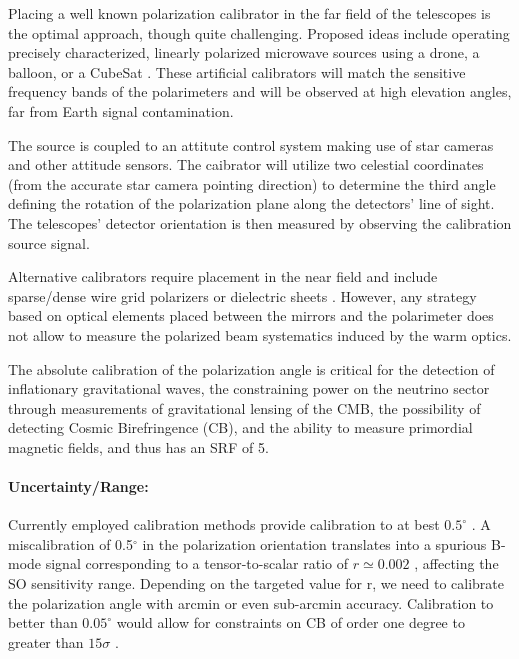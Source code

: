 Placing a well known polarization calibrator in the far field of the telescopes
is the optimal approach, though quite challenging. Proposed ideas include
operating precisely characterized, linearly polarized microwave sources using a
drone, a balloon, or a CubeSat \cite{nati_2017, Johnson2015}. These artificial
calibrators will match the sensitive frequency bands of the polarimeters and
will be observed at high elevation angles, far from Earth signal contamination.

The source is coupled to an attitute control system making use of star cameras
and other attitude sensors. The caibrator will utilize two celestial
coordinates (from the accurate star camera pointing direction) to determine the
third angle defining the rotation of the polarization plane along the
detectors' line of sight. The telescopes' detector orientation is then measured
by observing the calibration source signal. 


Alternative calibrators require placement in the near field and include
sparse/dense wire grid polarizers or dielectric sheets \cite{Takahashi2010,
2016arXiv160701825K}.  However, any strategy based on optical elements placed
between the mirrors and the polarimeter does not allow to measure the polarized
beam systematics induced by the warm optics. 


The absolute calibration of the polarization angle is critical for the
detection of inflationary gravitational waves, the constraining power on the
neutrino sector through measurements of gravitational lensing of the CMB, the
possibility of detecting Cosmic Birefringence (CB), and the ability to measure
primordial magnetic fields, and thus has an SRF of 5.

\paragraph{Uncertainty/Range:}

Currently employed calibration methods provide calibration to at
best $0.5^{\circ}$ \cite{2016MNRAS.455.1981K}. A miscalibration of
0.5$^{\circ}$ in the polarization orientation translates into a spurious B-mode
signal corresponding to a tensor-to-scalar ratio of $r \simeq 0.002$
\cite{abitbol16, doi:10.1142/S0218271816400125}, affecting the SO sensitivity
range. Depending on the targeted value for r, we need to calibrate the
polarization angle with arcmin or even sub-arcmin accuracy.  Calibration to
better than $0.05^{\circ}$ would allow for constraints on CB of order one
degree to greater than $15\sigma$ \cite{2016MNRAS.455.1981K}.

